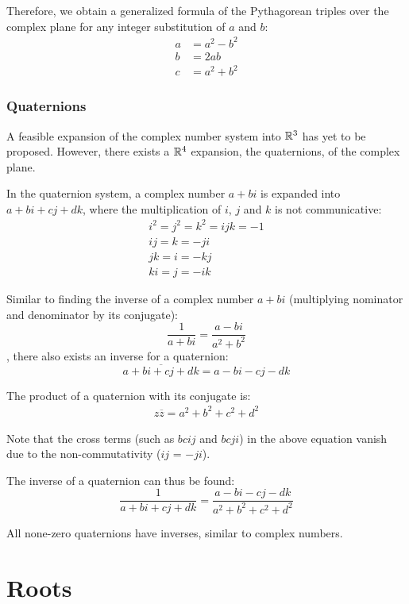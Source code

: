 \documentclass[12pt]{article}
\begin{document}
	Therefore, we obtain a generalized formula of the Pythagorean triples over the complex plane for any integer substitution of $a$ and $b$:
	\begin{align*}
		a &= a^2 - b^2 \\
		b &= 2ab \\
		c &= a^2 + b^2
	\end{align*}
	
	
	\subsubsection{Quaternions}
	
	A feasible expansion of the complex number system into $\mathbb{R}^3$ has yet to be proposed. However, there exists a $\mathbb{R}^4$ expansion, the quaternions, of the complex plane.
	
	In the quaternion system, a complex number $a + bi$ is expanded into $a + bi + cj + dk$, where the multiplication of $i$, $j$ and $k$ is not communicative:
	\begin{gather*}
		i^2 = j^2 = k^2 = ijk = -1 \\
		ij = k = -ji \\
		jk = i = -kj \\
		ki = j = -ik
	\end{gather*}
	
	Similar to finding the inverse of a complex number $a + bi$ (multiplying nominator and denominator by its conjugate):
	$$\frac{1}{a + bi} = \frac{a - bi}{a^2 + b^2}$$
	, there also exists an inverse for a quaternion:
	$$\overline{a + bi + cj + dk} = a - bi - cj - dk$$
	
	The product of a quaternion with its conjugate is:
	\begin{align*}
		z\overline{z} = a^2 + b^2 + c^2 + d^2
	\end{align*}
	
	Note that the cross terms (such as $bcij$ and $bcji$) in the above equation vanish due to the non-commutativity ($ij$ = $-ji$).
	
	The inverse of a quaternion can thus be found:
	$$\frac{1}{a + bi + cj + dk} = \frac{a - bi - cj - dk}{a^2 + b^2 + c^2 + d^2}$$
	
	All none-zero quaternions have inverses, similar to complex numbers.
	
	\section{Roots}
	
\end{document}
